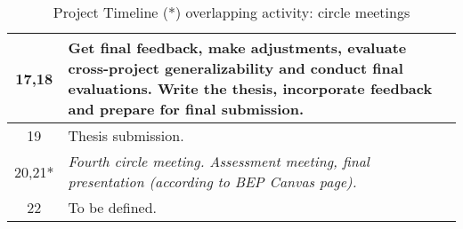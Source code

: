 \documentclass[11pt]{article}
\begin{document}
\begin{table}[ht]
\begin{tabular}{|c|p{12cm}|}
17,18 & Get final feedback, make adjustments, evaluate cross-project generalizability and conduct final evaluations. Write the thesis, incorporate feedback and prepare for final submission.\\ \hline

19 &  Thesis submission. \\ \hline

20,21* & \textit{Fourth circle meeting. Assessment meeting, final presentation (according to BEP Canvas page).} \\ \hline

22 & To be defined. \\ \hline

\end{tabular}
\caption{Project Timeline (*) overlapping activity: circle meetings}
\end{table}
\end{document}

